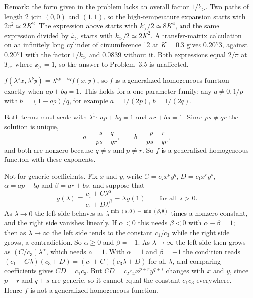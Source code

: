 Remark: the form given in the problem lacks an overall factor $1/k_>$. Two paths of length 2 join $(0,0)$ and
$(1,1)$, so the high-temperature expansion starts with $2v^2\simeq 2K^2$. The expression above starts with
$k_>^2/2\simeq 8K^4$, and the same expression divided by $k_>$ starts with $k_>/2\simeq 2K^2$. A transfer-matrix
calculation on an infinitely long cylinder of circumference 12 at $K = 0.3$ gives 0.2073, against 0.2071 with the factor
$1/k_>$ and 0.0839 without it. Both expressions equal $2/\pi$ at $T_c$, where $k_> = 1$, so the answer to
Problem~3.5 is unaffected.

 $f(\lambda^ax,\lambda^by) = \lambda^{ap+bq}f(x,y)$, so $f$ is a generalized homogeneous function exactly
when $ap+bq = 1$. This holds for a one-parameter family: any $a\ne 0,1/p$ with $b = (1-ap)/q$, for example
$a = 1/(2p)$, $b = 1/(2q)$.

 Both terms must scale with $\lambda^1$: $ap+bq = 1$ and $ar+bs = 1$. Since $ps\ne qr$ the solution is
unique,
\begin{equation}
  a = \frac{s-q}{ps-qr},\qquad b = \frac{p-r}{ps-qr},
\end{equation}
and both are nonzero because $q\ne s$ and $p\ne r$. So $f$ is a generalized homogeneous function with these exponents.

 Not for generic coefficients. Fix $x$ and $y$, write $C = c_2x^py^q$, $D = c_4x^ry^s$,
$\alpha = ap+bq$ and $\beta = ar+bs$, and suppose that
\begin{equation}
  g(\lambda)\equiv\frac{c_1+C\lambda^\alpha}{c_3+D\lambda^\beta} = \lambda\,g(1)\qquad\text{for all }\lambda>0 .
\end{equation}
As $\lambda\to 0$ the left side behaves as $\lambda^{\min(\alpha,0)-\min(\beta,0)}$ times a nonzero constant, and the
right side vanishes linearly. If $\alpha<0$ this needs $\beta<0$ with $\alpha-\beta = 1$; then as $\lambda\to\infty$ the
left side tends to the constant $c_1/c_3$ while the right side grows, a contradiction. So $\alpha\ge 0$ and
$\beta = -1$. As $\lambda\to\infty$ the left side then grows as $(C/c_3)\lambda^\alpha$, which needs $\alpha = 1$. With
$\alpha = 1$ and $\beta = -1$ the condition reads $(c_1+C\lambda)(c_3+D) = (c_1+C)(c_3\lambda+D)$ for all $\lambda$, and
comparing coefficients gives $CD = c_1c_3$. But $CD = c_2c_4x^{p+r}y^{q+s}$ changes with $x$ and $y$, since $p+r$ and
$q+s$ are generic, so it cannot equal the constant $c_1c_3$ everywhere. Hence $f$ is not a generalized homogeneous
function.

